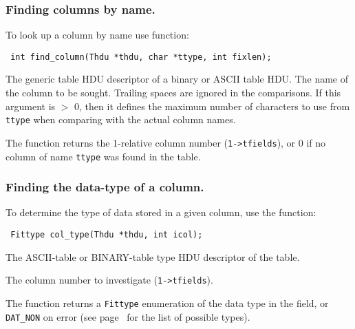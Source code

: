 \subsubsection{Finding columns by name.}

To look up a column by name use function:
\label{find_column}\begin{verbatim}
 int find_column(Thdu *thdu, char *ttype, int fixlen);
\end{verbatim}
\begin{arglist}
 The generic table HDU descriptor of a binary or ASCII
          table HDU.
 The name of the column to be sought. Trailing spaces
          are ignored in the comparisons.
 If this argument is $>$ 0, then it defines the maximum
               number of characters to use from \verb`ttype` when
               comparing with the actual column names.
\end{arglist}

The function returns the 1-relative column number (\verb`1->tfields`), or
0 if no column of name \verb`ttype` was found in the table.

\subsubsection{Finding the data-type of a column.}
To determine the type of data stored in a given column, use the
function:
\label{col_type}\begin{verbatim}
 Fittype col_type(Thdu *thdu, int icol);
\end{verbatim}
\begin{arglist}

 The ASCII-table or BINARY-table type HDU descriptor of
             the table.

 The column number to investigate (\verb`1->tfields`).

\end{arglist}

The function returns a \verb`Fittype` enumeration of the data type in the
field, or \verb`DAT_NON` on error (see page~\pageref{Fittype} for the list
of possible types).

